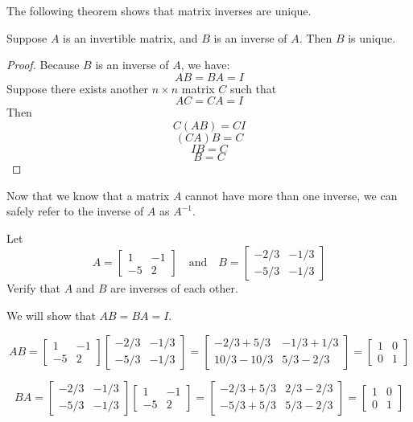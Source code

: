 \documentclass{ximera}
\begin{document}
The following theorem shows that matrix inverses are unique.

\begin{theorem}\label{th:matinverseunique} Suppose $A$ is an invertible matrix, and $B$ is an inverse of $A$.  Then $B$ is unique.
\end{theorem}
\begin{proof}
Because $B$ is an inverse of $A$, we have:
$$AB=BA=I$$
Suppose there exists another $n\times n$ matrix $C$ such that 
$$AC=CA=I$$
Then
$$C(AB)=CI$$
$$(CA)B=C$$
$$IB=C$$
$$B=C$$
\end{proof}
Now that we know that a matrix $A$ cannot have more than one inverse, we can safely refer to the inverse of $A$ as $A^{-1}$.

\begin{example}\label{ex:inverse1} Let $$A=\begin{bmatrix}1 & -1\\-5 & 2\end{bmatrix}\quad\text{and}\quad B=\begin{bmatrix}-2/3 & -1/3\\-5/3 & -1/3\end{bmatrix}$$ Verify that $A$ and $B$ are inverses of each other.
\begin{explanation} We will show that $AB=BA=I$.

$$
AB=\begin{bmatrix}1 & -1\\-5 & 2\end{bmatrix}\begin{bmatrix}-2/3 & -1/3\\-5/3 & -1/3\end{bmatrix}
=\begin{bmatrix}-2/3+5/3 & -1/3+1/3\\10/3-10/3 & 5/3-2/3\end{bmatrix}=\begin{bmatrix}1 & 0\\0 & 1\end{bmatrix}
$$

$$
BA=\begin{bmatrix}-2/3 & -1/3\\-5/3 & -1/3\end{bmatrix}\begin{bmatrix}1 & -1\\-5 & 2\end{bmatrix}
=\begin{bmatrix}-2/3+5/3 & 2/3-2/3\\-5/3+5/3 & 5/3-2/3\end{bmatrix}=\begin{bmatrix}1 & 0\\0 & 1\end{bmatrix}
$$
\end{explanation}
\end{example}
\end{document}
